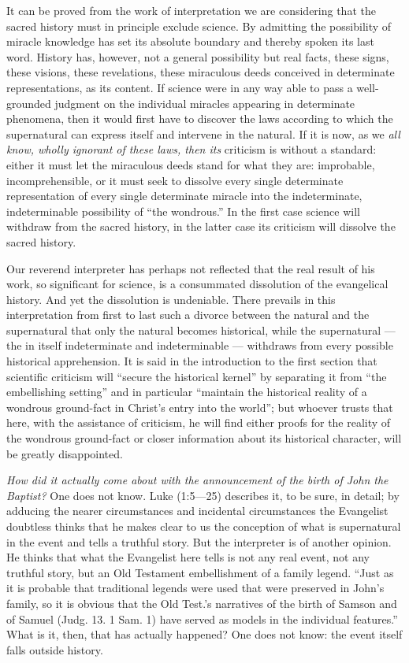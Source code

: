 \documentclass[12pt,a4paper,openany]{book}
\newcommand{\opage}[1]{\marginnote{\footnotesize\textit{[#1]}}}
\begin{document}
It can be proved from the work of interpretation we are considering
that the sacred history must in principle exclude
science. By admitting the possibility of miracle
knowledge has set its absolute boundary and thereby spoken its last
word. History has, however, not a general possibility
but real facts, these signs, these
visions, these revelations, these miraculous deeds conceived in determinate
\setcounter{footnote}{0}%
\opage{308}representations, as its content. If
science were in any way able to pass
a well-grounded judgment on the individual miracles
appearing in determinate phenomena, then it would first have to
discover the laws according to which the supernatural can
express itself and intervene in the natural. If it is now, as we
\emph{all know, wholly ignorant of these laws, then its}
criticism is without a standard: either it must let the miraculous deeds
stand for what they are: improbable, incomprehensible,
or it must seek to dissolve every single determinate
representation of every single determinate miracle into the indeterminate, indeterminable possibility
of ``the wondrous.'' In the
first case science will withdraw from the
sacred history, in the latter case its criticism will dissolve
the sacred history.

Our reverend interpreter has perhaps not reflected
that the real result of his work, so significant
for science, is a consummated
dissolution of the evangelical history. And yet the dissolution is
undeniable. There prevails in this interpretation
from first to last such a divorce between the
natural and the supernatural that only the natural
becomes historical, while the supernatural --- the in itself
indeterminate and indeterminable --- withdraws from every
possible historical apprehension. It is said in the introduction
to the first section that scientific criticism will ``secure
the historical kernel'' by separating it from ``the
embellishing setting'' and in particular ``maintain the historical
reality of a wondrous ground-fact in
Christ's entry into the world''; but whoever trusts
that here, with the assistance of criticism, he will find either
\setcounter{footnote}{0}%
\opage{309}proofs for the reality of the wondrous ground-fact or
closer information about its historical character, will be
greatly disappointed.

\emph{How did it actually come about with the announcement
of the birth of John the Baptist?} One
does not know. Luke (1:5—25) describes it, to be sure,
in detail; by adducing the nearer circumstances and
incidental circumstances the Evangelist doubtless thinks that he makes clear
to us the conception of what is supernatural in the event and
tells a truthful story. But the interpreter is of
another opinion. He thinks that what the Evangelist here
tells is not any real event, not any
truthful story, but an Old Testament embellishment
of a family legend. ``Just as it is probable
that traditional legends were used that were preserved
in John's family, so it is obvious that the
Old Test.'s narratives of the birth of Samson and of Samuel
(Judg. 13. 1 Sam. 1) have served as models
in the individual features.'' What is it, then, that has actually
happened? One does not know: the event itself falls
outside history.
\end{document}
